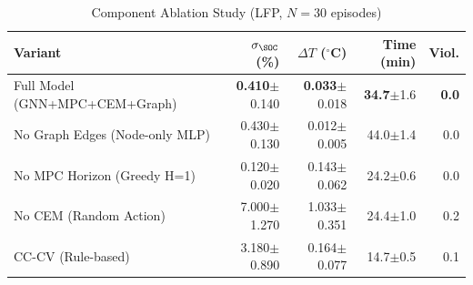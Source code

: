 \begin{table}[!t]
\caption{Component Ablation Study (LFP, $N=30$ episodes)}
\label{tab:ablation_components}
\centering
\renewcommand{\arraystretch}{1.2}
\setlength{\tabcolsep}{4pt}
\begin{tabular}{lrrrr}
\toprule
Variant & $\sigma_{\SOC}$ (\%) & $\Delta T$ ($^\circ$C) & Time (min) & Viol. \\
\midrule
  Full Model (GNN+MPC+CEM+Graph)         & \textbf{0.410}{\tiny$\pm$0.140} & \textbf{0.033}{\tiny$\pm$0.018} & \textbf{34.7}{\tiny$\pm$1.6} & \textbf{0.0} \\
  No Graph Edges (Node-only MLP)         & 0.430{\tiny$\pm$0.130} & 0.012{\tiny$\pm$0.005} & 44.0{\tiny$\pm$1.4} & 0.0 \\
  No MPC Horizon (Greedy H=1)            & 0.120{\tiny$\pm$0.020} & 0.143{\tiny$\pm$0.062} & 24.2{\tiny$\pm$0.6} & 0.0 \\
  No CEM (Random Action)                 & 7.000{\tiny$\pm$1.270} & 1.033{\tiny$\pm$0.351} & 24.4{\tiny$\pm$1.0} & 0.2 \\
  CC-CV (Rule-based)                     & 3.180{\tiny$\pm$0.890} & 0.164{\tiny$\pm$0.077} & 14.7{\tiny$\pm$0.5} & 0.1 \\
\bottomrule
\end{tabular}
\end{table}
